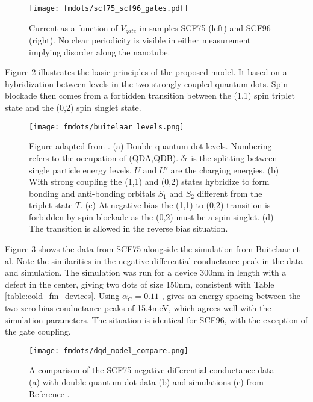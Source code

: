 \begin{figure}
    \centering
    \texttt{[image: fmdots/scf75\_scf96\_gates.pdf]}
    \caption{Current as a function of $V_{gate}$ in samples SCF75 (left) and SCF96 (right). No clear periodicity is visible in either measurement implying disorder along the nanotube.}
    \label{fig:scf75_scf96_gates}
\end{figure}

Figure \ref{fig:buitelaar_levels} illustrates the basic principles of the proposed model. It based on a hybridization between levels in the two strongly coupled quantum dots. Spin blockade then comes from a forbidden transition between the (1,1) spin triplet state and the (0,2) spin singlet state.

\begin{figure}
    \centering
    \texttt{[image: fmdots/buitelaar\_levels.png]}
    \caption{Figure adapted from \cite{Buitelaar2008}. (a) Double quantum dot levels. Numbering refers to the occupation of (QDA,QDB). $\delta \epsilon$ is the splitting between single particle energy levels. $U$ and $U'$ are the charging energies. (b) With strong coupling the (1,1) and (0,2) states hybridize to form bonding and anti-bonding orbitals $S_1$ and $S_2$ different from the triplet state $T$. (c) At negative bias the (1,1) to (0,2) transition is forbidden by spin blockade as the (0,2) must be a spin singlet. (d) The transition is allowed in the reverse bias situation.}
    \label{fig:buitelaar_levels}
\end{figure}

Figure \ref{fig:dqd_model_compare} shows the data from SCF75 alongside the simulation from Buitelaar et al. Note the similarities in the negative differential conductance peak in the data and simulation. The simulation was run for a device 300nm in length with a defect in the center, giving two dots of size 150nm, consistent with Table \ref{table:cold_fm_devices}. Using $\alpha_G = 0.11$ , gives an energy spacing between the two zero bias conductance peaks of 15.4meV, which agrees well with the simulation parameters. The situation is identical for SCF96, with the exception of the gate coupling.

\begin{figure}
    \centering
    \texttt{[image: fmdots/dqd\_model\_compare.png]}
    \caption{A comparison of the SCF75 negative differential conductance data (a) with double quantum dot data (b) and simulations (c) from Reference \cite{Buitelaar2008}.}
    \label{fig:dqd_model_compare}
\end{figure}

